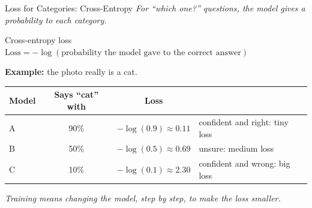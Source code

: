 \begin{frame}{Loss for Categories: Cross-Entropy}
    \textit{For ``which one?'' questions, the model gives a probability to each category.}

    \vspace{0.3em}
    \begin{block}{Cross-entropy loss}
        \centering
        $\text{Loss} = -\log(\text{probability the model gave to the correct answer})$
    \end{block}

    \vspace{0.2em}
    \textbf{Example:} the photo really is a cat.

    \centering
    \renewcommand{\arraystretch}{1.25}
    \begin{tabular}{lccl}
        \toprule
        \textbf{Model} & \textbf{Says ``cat'' with} & \textbf{Loss} & \\
        \midrule
        A & 90\% & $-\log(0.9) \approx 0.11$ & confident and right: tiny loss \\
        B & 50\% & $-\log(0.5) \approx 0.69$ & unsure: medium loss \\
        C & 10\% & $-\log(0.1) \approx 2.30$ & confident and wrong: big loss \\
        \bottomrule
    \end{tabular}

    \vspace{0.5em}
    \textit{Training means changing the model, step by step, to make the loss smaller.}
\end{frame}


